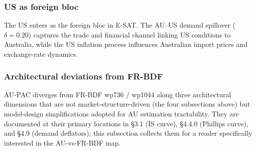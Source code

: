 \documentclass[
]{article}
\begin{document}
\subsubsection{US as foreign bloc}\label{us-as-foreign-bloc}

The US enters as the foreign bloc in E-SAT. The AU--US demand spillover
(\(\delta = 0.20\)) captures the trade and financial channel linking US
conditions to Australia, while the US inflation process influences
Australian import prices and exchange-rate dynamics.

\subsubsection{Architectural deviations from
FR-BDF}\label{architectural-deviations-from-fr-bdf}

AU-PAC diverges from FR-BDF wp736 / wp1044 along three architectural
dimensions that are not market-structure-driven (the four subsections
above) but model-design simplifications adopted for AU estimation
tractability. They are documented at their primary locations in §3.1 (IS
curve), §4.4.0 (Phillips curve), and §4.9 (demand deflators); this
subsection collects them for a reader specifically interested in the
AU-vs-FR-BDF map.
\end{document}
